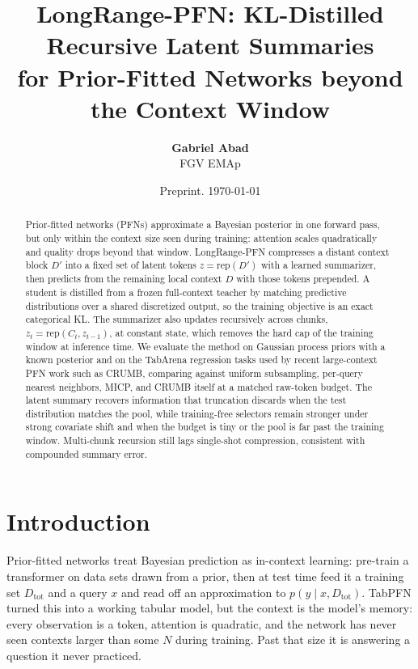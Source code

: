 \documentclass[11pt]{article}
\title{\textbf{LongRange-PFN: KL-Distilled Recursive Latent Summaries\\
for Prior-Fitted Networks beyond the Context Window}}
\author{%
\begin{tabular}{c}
\textbf{Gabriel Abad}\\
FGV EMAp\\
\end{tabular}
}
\date{Preprint. \today}
\newcommand{\Dtot}{D_{\mathrm{tot}}}
\newcommand{\Dfar}{D'}
\newcommand{\Dloc}{D}
\newcommand{\rep}{\mathrm{rep}}
\begin{document}
\maketitle

\begin{abstract}
Prior-fitted networks (PFNs) approximate a Bayesian posterior in one forward
pass, but only within the context size seen during training: attention scales
quadratically and quality drops beyond that window. LongRange-PFN compresses a
distant context block $\Dfar$ into a fixed set of latent tokens
$z = \rep(\Dfar)$ with a learned summarizer, then predicts from the remaining
local context $\Dloc$ with those tokens prepended. A student is distilled from
a frozen full-context teacher by matching predictive distributions over a
shared discretized output, so the training objective is an exact categorical
KL. The summarizer also updates recursively across chunks,
$z_t = \rep(C_t, z_{t-1})$, at constant state, which removes the hard cap of
the training window at inference time. We evaluate the method on Gaussian
process priors with a known posterior and on the TabArena regression tasks
used by recent large-context PFN work such as CRUMB, comparing against uniform
subsampling, per-query nearest neighbors, MICP, and CRUMB itself at a matched
raw-token budget. The latent summary recovers information that truncation
discards when the test distribution matches the pool, while training-free
selectors remain stronger under strong covariate shift and when the budget is
tiny or the pool is far past the training window. Multi-chunk recursion still
lags single-shot compression, consistent with compounded summary error.
\end{abstract}

\section{Introduction}
\label{sec:intro}

Prior-fitted networks \citep{muller2022pfn} treat Bayesian prediction as
in-context learning: pre-train a transformer on data sets drawn from a
prior, then at test time feed it a training set $\Dtot$ and a query $x$ and
read off an approximation to $p(y \mid x, \Dtot)$. TabPFN
\citep{hollmann2023tabpfn, hollmann2025tabpfn} turned this into a working
tabular model, but the context is the model's memory: every observation is
a token, attention is quadratic, and the network has never seen contexts
larger than some $N$ during training. Past that size it is answering a
question it never practiced.
\end{document}
